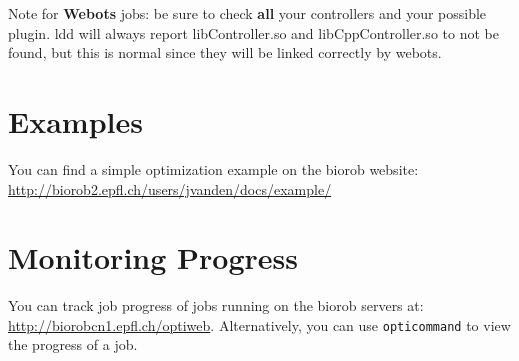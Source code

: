 \documentclass{report}
\begin{document}
Note for \textbf{Webots} jobs: be sure to check \textbf{all} your controllers
and your possible plugin. ldd will always report libController.so and
libCppController.so to not be found, but this is normal since they will be
linked correctly by webots.

\section{Examples}
You can find a simple optimization example on the biorob website:
\url{http://biorob2.epfl.ch/users/jvanden/docs/example/}

\section{Monitoring Progress}
You can track job progress of jobs running on the biorob servers at:
\url{http://biorobcn1.epfl.ch/optiweb}. Alternatively, you can use
\verb!opticommand! to view the progress of a job.

\newpage



\end{document}
